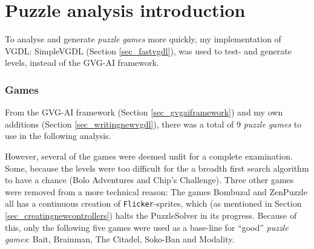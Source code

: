 \documentclass[a4paper,titlepage,final]{report}
\begin{document}
\section{Puzzle analysis introduction}
\label{sec_task3intro}
To analyse and generate \textit{puzzle games} more quickly, my implementation of VGDL: SimpleVGDL (Section \ref{sec_fastvgdl}), was used to test- and generate levels, instead of the GVG-AI framework.



\subsubsection*{Games} 
From the GVG-AI framework (Section \ref{sec_gvgaiframework}) and my own additions (Section \ref{sec_writingnewvgdl}), there was a total of 9 \textit{puzzle games} to use in the following analysis.

However, several of the games were deemed unfit for a complete examination.
Some, because the levels were too difficult for the a breadth first search algorithm to have a chance (Bolo Adventures and Chip's Challenge).
Three other games were removed from a more technical reason: 
The games Bombuzal and ZenPuzzle all has a continuous creation of \texttt{Flicker}-sprites, which (as mentioned in Section \ref{sec_creatingnewcontrollers})  halts the PuzzleSolver in its progress.
Because of this, only the following five games were used as a base-line for ``good'' \textit{puzzle games}: Bait, Brainman, The Citadel, Soko-Ban and Modality.
\end{document}
